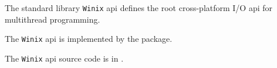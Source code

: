 
The standard library {\tt Winix} api defines the root cross-platform 
I/O api for multithread programming.

The {\tt Winix} api is implemented by the  package.

The {\tt Winix} api source code is in .
